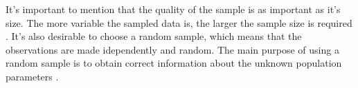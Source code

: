 It's important to mention that the quality of the sample is as important as it's size. The more variable the sampled data is, the larger the sample size is required \citep{Israel1992}. It's also desirable to choose a random sample, which means that the observations are made idependently and random. The main purpose of using a random sample is to obtain correct information about the unknown population parameters \citep{Walpole2012}. 



